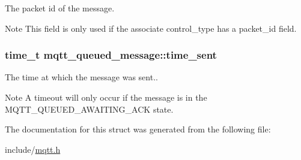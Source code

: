 The packet id of the message. 

\begin{DoxyNote}{Note}
This field is only used if the associate {\ttfamily control\+\_\+type} has a {\ttfamily packet\+\_\+id} field. 
\end{DoxyNote}
\subsubsection[{\texorpdfstring{time\+\_\+sent}{time_sent}}]{\setlength{\rightskip}{0pt plus 5cm}time\+\_\+t mqtt\+\_\+queued\+\_\+message\+::time\+\_\+sent}\hypertarget{structmqtt__queued__message_a04a6c9a1c732d33e59931ceefc8ac199}{}\label{structmqtt__queued__message_a04a6c9a1c732d33e59931ceefc8ac199}


The time at which the message was sent.. 

\begin{DoxyNote}{Note}
A timeout will only occur if the message is in the M\+Q\+T\+T\+\_\+\+Q\+U\+E\+U\+E\+D\+\_\+\+A\+W\+A\+I\+T\+I\+N\+G\+\_\+\+A\+CK {\ttfamily state}. 
\end{DoxyNote}


The documentation for this struct was generated from the following file\+:\begin{DoxyCompactItemize}
\item 
include/\hyperlink{mqtt_8h}{mqtt.\+h}\end{DoxyCompactItemize}
